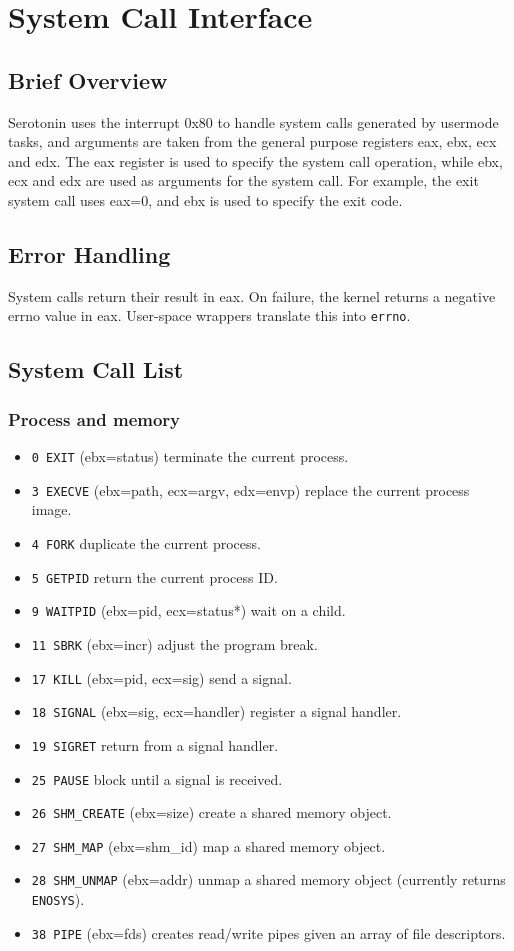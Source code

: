 \documentclass[11pt,a4paper]{article}
\begin{document}
\section{System Call Interface}
\subsection{Brief Overview}
Serotonin uses the interrupt 0x80 to handle system calls generated by usermode tasks, and arguments are taken from the general purpose registers eax, ebx, ecx and edx. The eax register is used to specify the system call operation, while ebx, ecx and edx are used as arguments for the system call. For example, the exit system call uses eax=0, and ebx is used to specify the exit code.

\subsection{Error Handling}
System calls return their result in eax. On failure, the kernel returns a negative errno value in eax. User-space wrappers translate this into \texttt{errno}.

\subsection{System Call List}
\subsubsection{Process and memory}
\begin{itemize}
	\item \texttt{0 EXIT} (ebx=status) terminate the current process.
	\item \texttt{3 EXECVE} (ebx=path, ecx=argv, edx=envp) replace the current process image.
	\item \texttt{4 FORK} duplicate the current process.
	\item \texttt{5 GETPID} return the current process ID.
	\item \texttt{9 WAITPID} (ebx=pid, ecx=status*) wait on a child.
	\item \texttt{11 SBRK} (ebx=incr) adjust the program break.
	\item \texttt{17 KILL} (ebx=pid, ecx=sig) send a signal.
	\item \texttt{18 SIGNAL} (ebx=sig, ecx=handler) register a signal handler.
	\item \texttt{19 SIGRET} return from a signal handler.
	\item \texttt{25 PAUSE} block until a signal is received.
	\item \texttt{26 SHM\_CREATE} (ebx=size) create a shared memory object.
	\item \texttt{27 SHM\_MAP} (ebx=shm\_id) map a shared memory object.
	\item \texttt{28 SHM\_UNMAP} (ebx=addr) unmap a shared memory object (currently returns \texttt{ENOSYS}).
	\item \texttt{38 PIPE} (ebx=fds) creates read/write pipes given an array of file descriptors.
\end{itemize}
\end{document}
